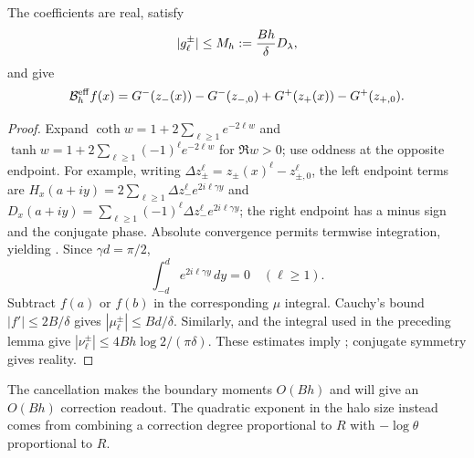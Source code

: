\begin{lemma}
\label{lem:boundary-series}
The coefficients are real, satisfy
\begin{equation}
 |g_\ell^\pm|\le M_h:=\frac{Bh}\delta D_\lambda,
 \label{eq:gh-bound}
\end{equation}
and give
\begin{equation}
 \mathcal B_h^{\rm eff}f(x)
 =G^-(z_-(x))-G^-(z_{-,0})+G^+(z_+(x))-G^+(z_{+,0}).
 \label{eq:boundary-series}
\end{equation}
\end{lemma}
\begin{proof}
Expand $\coth w=1+2\sum_{\ell\ge1}e^{-2\ell w}$ and
$\tanh w=1+2\sum_{\ell\ge1}(-1)^\ell e^{-2\ell w}$ for $\Re w>0$;
use oddness at the opposite endpoint. For example, writing
$\Delta z_\pm^\ell=z_\pm(x)^\ell-z_{\pm,0}^\ell$, the left endpoint terms
are $H_x(a+iy)=2\sum_{\ell\ge1}\Delta z_-^\ell e^{2i\ell\gamma y}$ and
$D_x(a+iy)=\sum_{\ell\ge1}(-1)^\ell\Delta z_-^\ell e^{2i\ell\gamma y}$;
the right endpoint has a minus sign and the conjugate phase. Absolute
convergence permits termwise integration, yielding .
Since $\gamma d=\pi/2$,
\begin{equation}
 \int_{-d}^d e^{2i\ell\gamma y}\,dy=0\quad(\ell\ge1).
 \label{eq:moment-cancel}
\end{equation}
Subtract $f(a)$ or $f(b)$ in the corresponding $\mu$ integral. Cauchy's bound
$|f'|\le2B/\delta$ gives $|\mu_\ell^\pm|\le Bd/\delta$.
Similarly,  and the integral used in the preceding
lemma give $|\nu_\ell^\pm|\le4Bh\log2/(\pi\delta)$.
These estimates imply ; conjugate symmetry gives reality.
\end{proof}
The cancellation makes the boundary moments $O(Bh)$ and will give an
$O(Bh)$ correction readout. The quadratic exponent in the halo size instead
comes from combining a correction degree proportional to $R$ with
$-\log\theta$ proportional to $R$.

